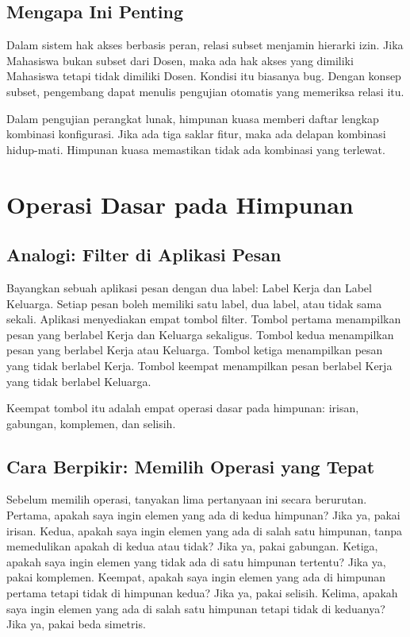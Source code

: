 \documentclass[11pt,a4paper]{article}
\begin{document}
\subsection{Mengapa Ini Penting}

Dalam sistem hak akses berbasis peran, relasi subset menjamin hierarki izin. Jika Mahasiswa bukan subset dari Dosen, maka ada hak akses yang dimiliki Mahasiswa tetapi tidak dimiliki Dosen. Kondisi itu biasanya bug. Dengan konsep subset, pengembang dapat menulis pengujian otomatis yang memeriksa relasi itu.

Dalam pengujian perangkat lunak, himpunan kuasa memberi daftar lengkap kombinasi konfigurasi. Jika ada tiga saklar fitur, maka ada delapan kombinasi hidup-mati. Himpunan kuasa memastikan tidak ada kombinasi yang terlewat.

\section{Operasi Dasar pada Himpunan}

\subsection{Analogi: Filter di Aplikasi Pesan}

Bayangkan sebuah aplikasi pesan dengan dua label: Label Kerja dan Label Keluarga. Setiap pesan boleh memiliki satu label, dua label, atau tidak sama sekali. Aplikasi menyediakan empat tombol filter. Tombol pertama menampilkan pesan yang berlabel Kerja dan Keluarga sekaligus. Tombol kedua menampilkan pesan yang berlabel Kerja atau Keluarga. Tombol ketiga menampilkan pesan yang tidak berlabel Kerja. Tombol keempat menampilkan pesan berlabel Kerja yang tidak berlabel Keluarga.

Keempat tombol itu adalah empat operasi dasar pada himpunan: irisan, gabungan, komplemen, dan selisih.

\subsection{Cara Berpikir: Memilih Operasi yang Tepat}

Sebelum memilih operasi, tanyakan lima pertanyaan ini secara berurutan. Pertama, apakah saya ingin elemen yang ada di kedua himpunan? Jika ya, pakai irisan. Kedua, apakah saya ingin elemen yang ada di salah satu himpunan, tanpa memedulikan apakah di kedua atau tidak? Jika ya, pakai gabungan. Ketiga, apakah saya ingin elemen yang tidak ada di satu himpunan tertentu? Jika ya, pakai komplemen. Keempat, apakah saya ingin elemen yang ada di himpunan pertama tetapi tidak di himpunan kedua? Jika ya, pakai selisih. Kelima, apakah saya ingin elemen yang ada di salah satu himpunan tetapi tidak di keduanya? Jika ya, pakai beda simetris.
\end{document}
